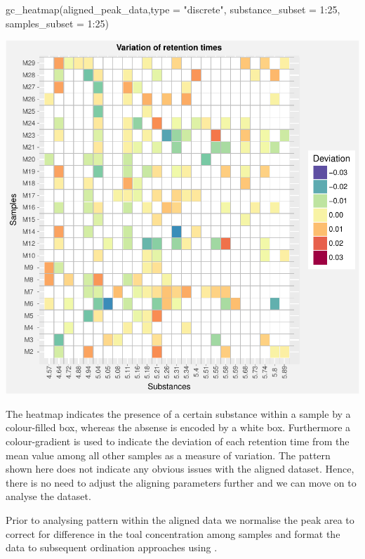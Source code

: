 \begin{Schunk}
\begin{Sinput}
gc_heatmap(aligned_peak_data,type = "discrete", substance_subset = 1:25, samples_subset = 1:25)
\end{Sinput}


\begin{center}\includegraphics{ottensmann-stoffel-hoffman_files/figure-latex/unnamed-chunk-8-1} \end{center}

\end{Schunk}

The heatmap indicates the presence of a certain substance within a
sample by a colour-filled box, whereas the absense is encoded by a white
box. Furthermore a colour-gradient is used to indicate the deviation of
each retention time from the mean value among all other samples as a
measure of variation. The pattern shown here does not indicate any
obvious issues with the aligned dataset. Hence, there is no need to
adjust the aligning parameters further and we can move on to analyse the
dataset. \par
Prior to analysing pattern within the aligned data we normalise the peak
area to correct for difference in the toal concentration among samples
and format the data to subsequent ordination approaches using
.

